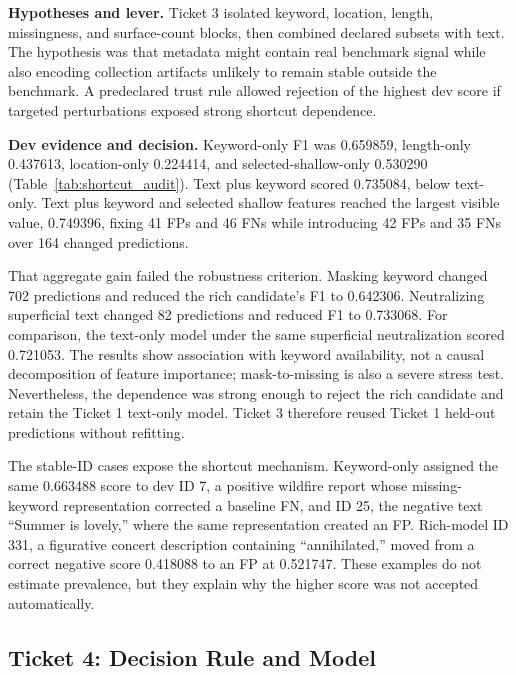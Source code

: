 \documentclass[conference]{IEEEtran}
\begin{document}
\textbf{Hypotheses and lever.} Ticket 3 isolated keyword, location, length, missingness, and surface-count blocks, then combined declared subsets with text. The hypothesis was that metadata might contain real benchmark signal while also encoding collection artifacts unlikely to remain stable outside the benchmark. A predeclared trust rule allowed rejection of the highest dev score if targeted perturbations exposed strong shortcut dependence.



\textbf{Dev evidence and decision.} Keyword-only F1 was 0.659859, length-only 0.437613, location-only 0.224414, and selected-shallow-only 0.530290 (Table~\ref{tab:shortcut_audit}). Text plus keyword scored 0.735084, below text-only. Text plus keyword and selected shallow features reached the largest visible value, 0.749396, fixing 41 FPs and 46 FNs while introducing 42 FPs and 35 FNs over 164 changed predictions.

That aggregate gain failed the robustness criterion. Masking keyword changed 702 predictions and reduced the rich candidate's F1 to 0.642306. Neutralizing superficial text changed 82 predictions and reduced F1 to 0.733068. For comparison, the text-only model under the same superficial neutralization scored 0.721053. The results show association with keyword availability, not a causal decomposition of feature importance; mask-to-missing is also a severe stress test. Nevertheless, the dependence was strong enough to reject the rich candidate and retain the Ticket 1 text-only model. Ticket 3 therefore reused Ticket 1 held-out predictions without refitting.

The stable-ID cases expose the shortcut mechanism. Keyword-only assigned the same 0.663488 score to dev ID 7, a positive wildfire report whose missing-keyword representation corrected a baseline FN, and ID 25, the negative text ``Summer is lovely,'' where the same representation created an FP. Rich-model ID 331, a figurative concert description containing ``annihilated,'' moved from a correct negative score 0.418088 to an FP at 0.521747. These examples do not estimate prevalence, but they explain why the higher score was not accepted automatically.

\subsection{Ticket 4: Decision Rule and Model}
\end{document}
